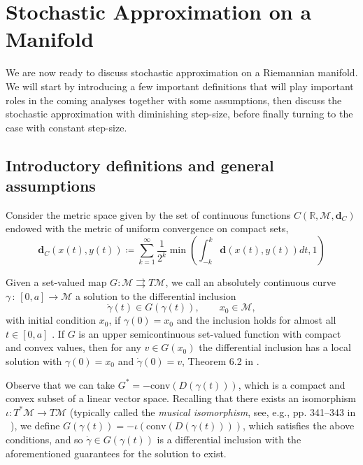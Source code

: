 \documentclass{article}
\newcommand{\CM}{\mathcal{M}}
\newcommand{\bd}{\mathbf{d}}
\begin{document}
\section{Stochastic Approximation on a Manifold}\label{s:sa}
We are now ready to discuss stochastic approximation on a Riemannian manifold. We will start by introducing a few important definitions that will play important roles in the coming analyses together with some assumptions, then discuss the stochastic approximation with diminishing step-size, before finally turning to the case with constant step-size.


\subsection{Introductory definitions and general assumptions}



Consider the metric space given by the set of continuous functions $C(\mathbb{R},\mathcal{M},\bd_C)$ endowed with the metric of uniform convergence on compact sets,
\[
\bd_C(x(t),y(t)) \coloneqq \sum\limits_{k=1}^\infty \frac{1}{2^k}\min\left(\int_{-k}^k \bd(x(t),y(t))dt ,1\right)
\]



Given a set-valued map $G:\mathcal{M}\rightrightarrows T\mathcal{M}$, we call an absolutely continuous curve $\gamma \,:\,[0,a]\to \CM$ a solution to the differential inclusion
\begin{equation}\label{eq:diffInclusion}
    \dot\gamma(t)\in G(\gamma(t)),\qquad x_0\in \CM,
\end{equation}
with initial condition $x_0$, if $\gamma(0)=x_0$ and the inclusion holds for almost all $t\in[0,a]$ \cite{Pouryayevali2019}. If $G$ is an upper semicontinuous set-valued function with compact and convex values, then for any $v\in G(x_0)$ the differential inclusion has a local solution with $\gamma(0)=x_0$ and $\dot\gamma(0)=v$, Theorem 6.2 in \cite{Ledyaev2007Nonsmooth}. 

Observe that we can take $G^*=-\text{conv}(D(\gamma(t)))$, which is a compact and convex subset of a linear vector space. Recalling that there exists an isomorphism $\iota:T^*\CM\to T\CM$ (typically called the \emph{musical isomorphism}, see, e.g., pp. 341–343 in ~\cite{lee2012smooth}), we define
$G(\gamma(t))=-\iota\left(\text{conv}(D(\gamma(t)))\right)$, which satisfies the above conditions, and so $\dot\gamma\in G(\gamma(t))$ is a differential inclusion with the aforementioned guarantees for the solution to exist.
\end{document}
